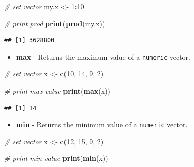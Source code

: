 \documentclass[11pt,]{book}
\newenvironment{Shaded}{\begin{snugshade}}{\end{snugshade}}
\newcommand{\KeywordTok}[1]{\textcolor[rgb]{0.27,0.27,0.27}{\textbf{#1}}}
\newcommand{\DecValTok}[1]{\textcolor[rgb]{0.06,0.06,0.06}{#1}}
\newcommand{\StringTok}[1]{\textcolor[rgb]{0.5,0.5,0.5}{#1}}
\newcommand{\CommentTok}[1]{\textcolor[rgb]{0.56,0.35,0.01}{\textit{#1}}}
\newcommand{\OperatorTok}[1]{\textcolor[rgb]{0.81,0.36,0.00}{\textbf{#1}}}
\newcommand{\NormalTok}[1]{#1}
\providecommand{\tightlist}{%
  \setlength{\itemsep}{0pt}\setlength{\parskip}{0pt}}
\begin{document}
\begin{Shaded}
\begin{Highlighting}[]
\CommentTok{# set vector}
\NormalTok{my.x <-}\StringTok{ }\DecValTok{1}\OperatorTok{:}\DecValTok{10}

\CommentTok{# print prod}
\KeywordTok{print}\NormalTok{(}\KeywordTok{prod}\NormalTok{(my.x))}
\end{Highlighting}
\end{Shaded}

\begin{verbatim}
## [1] 3628800
\end{verbatim}

\begin{itemize}
\tightlist
\item
  \textbf{max} - Returns the maximum value of a \texttt{numeric} vector.
\end{itemize}

\begin{Shaded}
\begin{Highlighting}[]
\CommentTok{# set vector}
\NormalTok{x <-}\StringTok{ }\KeywordTok{c}\NormalTok{(}\DecValTok{10}\NormalTok{, }\DecValTok{14}\NormalTok{, }\DecValTok{9}\NormalTok{, }\DecValTok{2}\NormalTok{)}

\CommentTok{# print max value}
\KeywordTok{print}\NormalTok{(}\KeywordTok{max}\NormalTok{(x))}
\end{Highlighting}
\end{Shaded}

\begin{verbatim}
## [1] 14
\end{verbatim}

\begin{itemize}
\tightlist
\item
  \textbf{min} - Returns the minimum value of a \texttt{numeric} vector.
\end{itemize}

\begin{Shaded}
\begin{Highlighting}[]
\CommentTok{# set vector}
\NormalTok{x <-}\StringTok{ }\KeywordTok{c}\NormalTok{(}\DecValTok{12}\NormalTok{, }\DecValTok{15}\NormalTok{, }\DecValTok{9}\NormalTok{, }\DecValTok{2}\NormalTok{)}

\CommentTok{# print min value}
\KeywordTok{print}\NormalTok{(}\KeywordTok{min}\NormalTok{(x))}
\end{Highlighting}
\end{Shaded}
\end{document}
